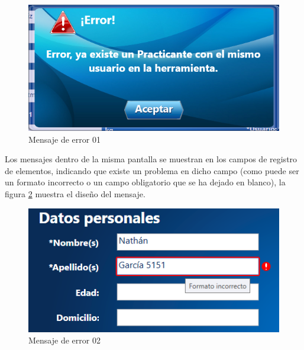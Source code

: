 \begin{figure}[H]
	\centering
		\includegraphics[scale=0.5]{./Figuras/Diseno_mensajes/Mensaje_error01}
	\caption{Mensaje de error 01}
	\label{dm:ME01}
\end{figure}

Los mensajes dentro de la misma pantalla se muestran en los campos de registro de elementos, indicando que existe un problema en dicho campo (como puede ser un formato incorrecto o un campo obligatorio que se ha dejado en blanco), la figura \ref{dm:ME02} muestra el diseño del mensaje.

\begin{figure}[H]
	\centering
		\includegraphics[scale=0.65]{./Figuras/Diseno_mensajes/Mensaje_error02}
	\caption{Mensaje de error 02}
	\label{dm:ME02}
\end{figure}